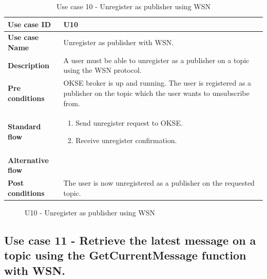 \begin{table}[ht!]
\centering
\begin{tabular}{|l|p{5cm}|}
\hline
\textbf{Use case ID} & U10 \\ \hline
\textbf{Use case Name} & Unregister as publisher with WSN. \\ \hline
\textbf{Description} & A user must be able to unregister as a publisher on a topic using the WSN protocol.  \\ \hline
\textbf{Pre conditions} & OKSE broker is up and running. The user is registered as a publisher on the topic which the user wants to unsubscribe from.  \\ \hline
\textbf{Standard flow} & \begin{enumerate}
\item Send unregister request to OKSE.
\item Receive unregister confirmation.
\end{enumerate} \\ \hline
\textbf{Alternative flow} & \\ \hline
\textbf{Post conditions} & The user is now unregistered as a publisher on the requested topic. 
  \\ \hline
\end{tabular}
\caption{Use case 10 - Unregister as publisher using WSN}
\label{uc10}
\end{table}

\begin{center}
  \begin{figure}[ht!]
    \caption{U10 - Unregister as publisher using WSN}
    \label{fig:u10}
  \end{figure}
\end{center}

\clearpage

\subsection{Use case 11 - Retrieve the latest message on a topic using the GetCurrentMessage function with WSN.}
\label{subsec:requirements_engineering-use_cases-get_message_wsn}

